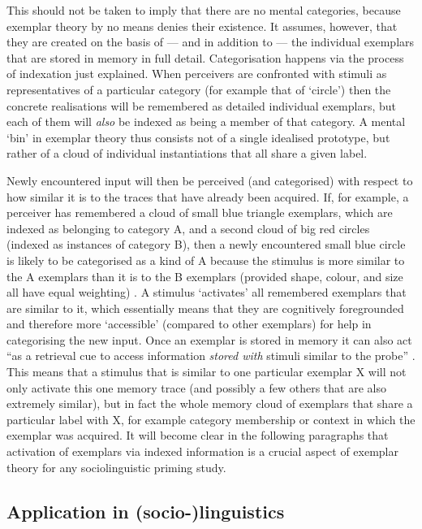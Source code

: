 This should not be taken to imply that there are no mental categories, because exemplar theory by no means denies their existence.
It assumes, however, that they are created on the basis of --- and in addition to --- the individual exemplars that are stored in memory in full detail.
Categorisation happens via the process of indexation just explained.
When perceivers are confronted with stimuli as representatives of a particular category (for example that of `circle') then the concrete realisations will be remembered as detailed individual exemplars, but each of them will \emph{also} be indexed as being a member of that category.
A mental `bin' in exemplar theory thus consists not of a single idealised prototype, but rather of a cloud of individual instantiations that all share a given label.

Newly encountered input will then be perceived (and categorised) with respect to how similar it is to the traces that have already been acquired.
If, for example, a perceiver has remembered a cloud of small blue triangle exemplars, which are indexed as belonging to category A, and a second cloud of big red circles (indexed as instances of category B), then a newly encountered small blue circle is likely to be categorised as a kind of A because the stimulus is more similar to the A exemplars than it is to the B exemplars (provided shape, colour, and size all have equal weighting) \parencite[cf.][210--212]{medinschaffer1978}.
A stimulus `activates' all remembered exemplars that are similar to it, which essentially means that they are cognitively foregrounded and therefore more `accessible' (compared to other exemplars) for help in categorising the new input.
Once an exemplar is stored in memory it can also act ``as a retrieval cue to access information \emph{stored with} stimuli similar to the probe'' \parencite[210, my emphasis]{medinschaffer1978}.
This means that a stimulus that is similar to one particular exemplar X will not only activate this one memory trace (and possibly a few others that are also extremely similar), but in fact the whole memory cloud of exemplars that share a particular label with X, for example category membership or context in which the exemplar was acquired.
It will become clear in the following paragraphs that activation of exemplars via indexed information is a crucial aspect of exemplar theory for any sociolinguistic priming study.

		\subsection{Application in (socio-)linguistics}
		\label{sec.sal.exemplar.socio}


